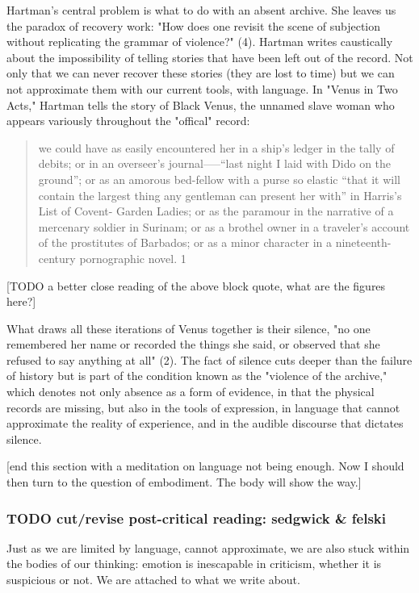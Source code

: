\documentclass[11pt]{article}
\begin{document}
Hartman's central problem is what to do with an absent archive. She
leaves us the paradox of recovery work: "How does one revisit the
scene of subjection without replicating the grammar of violence?"
(4). Hartman writes caustically about the impossibility of telling
stories that have been left out of the record. Not only that we can
never recover these stories (they are lost to time) but we can not
approximate them with our current tools, with language. In "Venus in
Two Acts," Hartman tells the story of Black Venus, the unnamed slave
woman who appears variously throughout the "offical" record:

\begin{quote}
we could have as easily encountered her in a ship’s ledger in the
tally of debits; or in an overseer’s journal—--“last night I laid with
Dido on the ground”; or as an amorous bed-fellow with a purse so
elastic “that it will contain the largest thing any gentleman can
present her with” in Harris’s List of Covent- Garden Ladies; or as the
paramour in the narrative of a mercenary soldier in Surinam; or as a
brothel owner in a traveler’s account of the prostitutes of Barbados;
or as a minor character in a nineteenth-century pornographic novel. 1
\end{quote}

[TODO a better close reading of the above block quote, what are the
figures here?]  

What draws all these iterations of Venus together is their silence,
"no one remembered her name or recorded the things she said, or
observed that she refused to say anything at all" (2). The fact of
silence cuts deeper than the failure of history but is part of the
condition known as the "violence of the archive," which denotes not
only absence as a form of evidence, in that the physical records are
missing, but also in the tools of expression, in language that cannot
approximate the reality of experience, and in the audible discourse
that dictates silence.

[end this section with a meditation on language not being enough. Now
I should then turn to the question of embodiment. The body will show
the way.]

\subsubsection{{\bfseries\sffamily TODO} cut/revise post-critical reading: sedgwick \& felski}
\label{sec:org17155d8}
Just as we are limited by language, cannot approximate, we are also
stuck within the bodies of our thinking: emotion is inescapable in
criticism, whether it is suspicious or not. We are attached to what we
write about.
\end{document}
